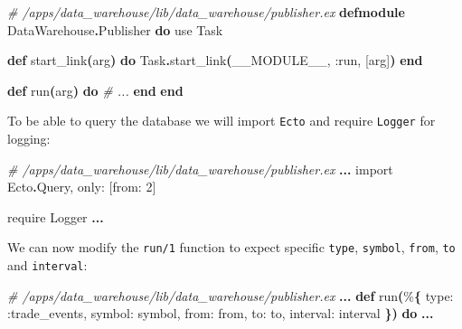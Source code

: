 \documentclass[
  oneside]{book}
\newenvironment{Shaded}{\begin{snugshade}}{\end{snugshade}}
\newcommand{\CommentTok}[1]{\textcolor[rgb]{0.56,0.35,0.01}{\textit{#1}}}
\newcommand{\ConstantTok}[1]{\textcolor[rgb]{0.56,0.35,0.01}{#1}}
\newcommand{\DecValTok}[1]{\textcolor[rgb]{0.00,0.00,0.81}{#1}}
\newcommand{\FunctionTok}[1]{\textcolor[rgb]{0.13,0.29,0.53}{\textbf{#1}}}
\newcommand{\ImportTok}[1]{#1}
\newcommand{\KeywordTok}[1]{\textcolor[rgb]{0.13,0.29,0.53}{\textbf{#1}}}
\newcommand{\NormalTok}[1]{#1}
\newcommand{\OperatorTok}[1]{\textcolor[rgb]{0.81,0.36,0.00}{\textbf{#1}}}
\newcommand{\OtherTok}[1]{\textcolor[rgb]{0.56,0.35,0.01}{#1}}
\newcommand{\VariableTok}[1]{\textcolor[rgb]{0.00,0.00,0.00}{#1}}
\begin{document}
\begin{Shaded}
\begin{Highlighting}[]
\CommentTok{\# /apps/data\_warehouse/lib/data\_warehouse/publisher.ex}
\KeywordTok{defmodule} \ConstantTok{DataWarehouse}\OperatorTok{.}\ConstantTok{Publisher} \KeywordTok{do}
  \ImportTok{use} \ConstantTok{Task}

  \KeywordTok{def}\NormalTok{ start\_link}\FunctionTok{(}\NormalTok{arg}\FunctionTok{)} \KeywordTok{do}
    \ConstantTok{Task}\OperatorTok{.}\NormalTok{start\_link}\FunctionTok{(}\ConstantTok{\_\_MODULE\_\_}\NormalTok{, }\VariableTok{:run}\NormalTok{, }\OtherTok{[}\NormalTok{arg}\OtherTok{]}\FunctionTok{)}
  \KeywordTok{end}

  \KeywordTok{def}\NormalTok{ run}\FunctionTok{(}\NormalTok{arg}\FunctionTok{)} \KeywordTok{do}
    \CommentTok{\# ...}
  \KeywordTok{end}
\KeywordTok{end}
\end{Highlighting}
\end{Shaded}

To be able to query the database we will import \texttt{Ecto} and require \texttt{Logger} for logging:

\begin{Shaded}
\begin{Highlighting}[]
  \CommentTok{\# /apps/data\_warehouse/lib/data\_warehouse/publisher.ex}
  \OperatorTok{...}
  \ImportTok{import} \ConstantTok{Ecto}\OperatorTok{.}\ConstantTok{Query}\NormalTok{, }\VariableTok{only:} \OtherTok{[}\VariableTok{from:} \DecValTok{2}\OtherTok{]}

  \ImportTok{require} \ConstantTok{Logger}
  \OperatorTok{...}
\end{Highlighting}
\end{Shaded}

We can now modify the \texttt{run/1} function to expect specific \texttt{type}, \texttt{symbol}, \texttt{from}, \texttt{to} and \texttt{interval}:

\begin{Shaded}
\begin{Highlighting}[]
  \CommentTok{\# /apps/data\_warehouse/lib/data\_warehouse/publisher.ex  }
  \OperatorTok{...}
  \KeywordTok{def}\NormalTok{ run}\FunctionTok{(}\NormalTok{\%}\FunctionTok{\{}
        \VariableTok{type:} \VariableTok{:trade\_events}\NormalTok{,}
        \VariableTok{symbol:}\NormalTok{ symbol,}
        \VariableTok{from:}\NormalTok{ from,}
        \VariableTok{to:}\NormalTok{ to,}
        \VariableTok{interval:}\NormalTok{ interval}
      \FunctionTok{\})} \KeywordTok{do}
    \OperatorTok{...}  
\end{Highlighting}
\end{Shaded}
\end{document}
